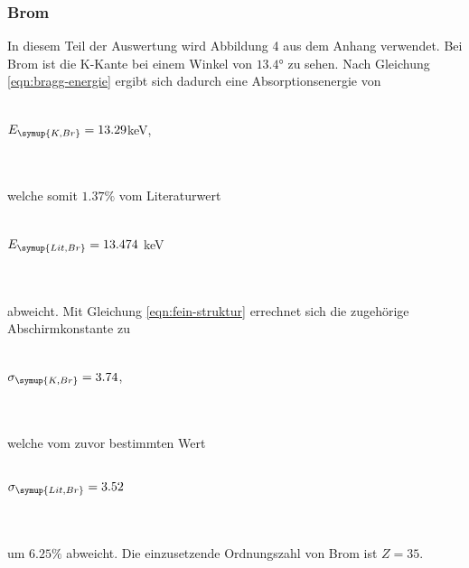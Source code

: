         \subsubsection{Brom}
            In diesem Teil der Auswertung wird Abbildung 4 aus dem Anhang verwendet.
            Bei Brom ist die K-Kante bei einem Winkel von $13.4°$ zu sehen. Nach 
            Gleichung \eqref{eqn:bragg-energie} ergibt sich dadurch eine Absorptionsenergie
            von 
            \\ \\
            \centerline{$E_{\symup{K, Br}} = 13.29$keV,}
            \\ \\
            welche somit $1.37 \%$ vom Literaturwert
            \\ \\
            \centerline{$E_{\symup{Lit, Br}} = 13.474$ keV \cite{periodic}}
            \\ \\
            abweicht. Mit Gleichung \eqref{eqn:fein-struktur} errechnet sich die 
            zugehörige Abschirmkonstante zu 
            \\ \\
            \centerline{$\sigma_{\symup{K, Br}} = 3.74$,}
            \\ \\
            welche vom zuvor bestimmten Wert
            \\ \\
            \centerline{$\sigma_{\symup{Lit, Br}} = 3.52$}
            \\ \\
            um $6.25 \%$ abweicht. Die einzusetzende Ordnungszahl von Brom 
            ist $Z = 35$.
